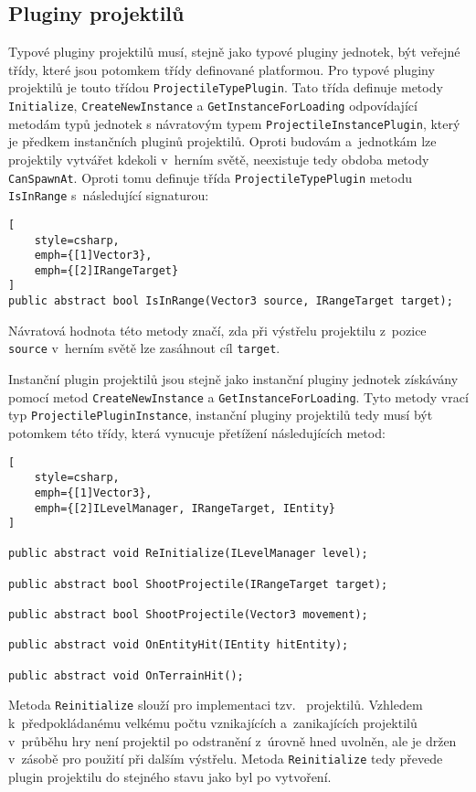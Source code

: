 \subsection{Pluginy projektilů}
Typové pluginy projektilů musí, stejně jako typové pluginy jednotek, být veřejné třídy, které jsou potomkem třídy definované platformou. Pro typové pluginy projektilů je touto třídou \texttt{ProjectileTypePlugin}. Tato třída definuje metody \texttt{Initialize}, \texttt{CreateNewInstance} a \texttt{GetInstanceForLoading} odpovídající metodám typů jednotek s návratovým typem \texttt{ProjectileInstancePlugin}, který je předkem instančních pluginů projektilů. Oproti budovám a~jednotkám lze projektily vytvářet kdekoli v~herním světě, neexistuje tedy obdoba metody \texttt{CanSpawnAt}. Oproti tomu definuje třída  \texttt{ProjectileTypePlugin} metodu \texttt{IsInRange} s~následující signaturou:

\begin{lstlisting}[
	style=csharp,
	emph={[1]Vector3},
	emph={[2]IRangeTarget}
]
public abstract bool IsInRange(Vector3 source, IRangeTarget target);
\end{lstlisting}

Návratová hodnota této metody značí, zda při výstřelu projektilu z~pozice \texttt{source} v~herním světě lze zasáhnout cíl \texttt{target}.

Instanční plugin projektilů jsou stejně jako instanční pluginy jednotek získávány pomocí metod \texttt{CreateNewInstance} a \texttt{GetInstanceForLoading}. Tyto metody vrací typ \texttt{ProjectilePluginInstance}, instanční pluginy projektilů tedy musí být potomkem této třídy, která vynucuje přetížení následujících metod:
\begin{lstlisting}[
	style=csharp,
	emph={[1]Vector3},
	emph={[2]ILevelManager, IRangeTarget, IEntity}
]

public abstract void ReInitialize(ILevelManager level);

public abstract bool ShootProjectile(IRangeTarget target);

public abstract bool ShootProjectile(Vector3 movement);

public abstract void OnEntityHit(IEntity hitEntity);

public abstract void OnTerrainHit();
\end{lstlisting}


Metoda \texttt{Reinitialize} slouží pro implementaci tzv.~ projektilů. Vzhledem k~předpokládanému velkému počtu vznikajících a~zanikajících projektilů v~průběhu hry není projektil po odstranění z~úrovně hned uvolněn, ale je držen v~zásobě pro použití při dalším výstřelu. Metoda \texttt{Reinitialize} tedy převede plugin projektilu do stejného stavu jako byl po vytvoření.

